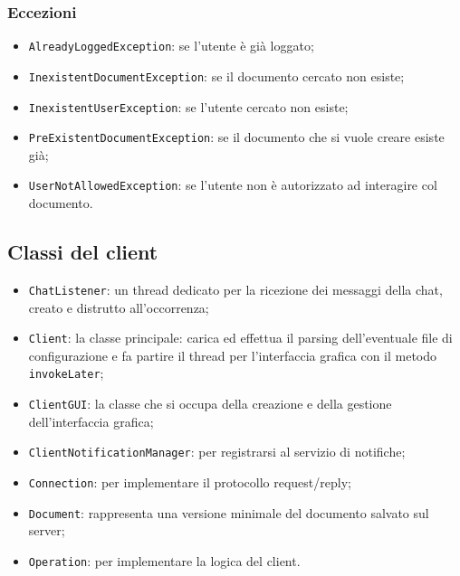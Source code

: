 \subsubsection{Eccezioni}
\begin{itemize}
	\item \texttt{AlreadyLoggedException}: se l'utente è già loggato;
	\item \texttt{InexistentDocumentException}: se il documento cercato non esiste;
	\item \texttt{InexistentUserException}: se l'utente cercato non esiste;
	\item \texttt{PreExistentDocumentException}: se il documento che si vuole creare esiste già;
	\item \texttt{UserNotAllowedException}: se l'utente non è autorizzato ad interagire col documento.
\end{itemize}

\subsection{Classi del client}
\begin{itemize}
	\item \texttt{ChatListener}: un thread dedicato per la ricezione dei messaggi della chat, creato e distrutto all'occorrenza;
	\item \texttt{Client}: la classe principale: carica ed effettua il parsing dell'eventuale file di configurazione e fa partire il thread per l'interfaccia grafica con il metodo \texttt{invokeLater};
	\item \texttt{ClientGUI}: la classe che si occupa della creazione e della gestione dell'interfaccia grafica;
	\item \texttt{ClientNotificationManager}: per registrarsi al servizio di notifiche;
	\item \texttt{Connection}: per implementare il protocollo request/reply;
	\item \texttt{Document}: rappresenta una versione minimale del documento salvato sul server;
	\item \texttt{Operation}: per implementare la logica del client.
\end{itemize}
